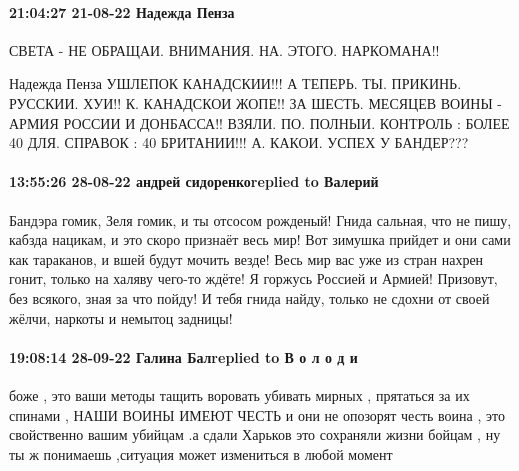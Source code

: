 \paragraph{21:04:27 21-08-22 Надежда Пенза}

СВЕТА - НЕ ОБРАЩАИ. ВНИМАНИЯ. НА. ЭТОГО. НАРКОМАНА!!

Надежда Пенза
УШЛЕПОК КАНАДСКИИ!!!
А ТЕПЕРЬ. ТЫ. ПРИКИНЬ. РУССКИИ. ХУИ!!
К. КАНАДСКОИ ЖОПЕ!!
ЗА ШЕСТЬ. МЕСЯЦЕВ ВОИНЫ -
АРМИЯ РОССИИ И ДОНБАССА!!
ВЗЯЛИ. ПО. ПОЛНЫИ. КОНТРОЛЬ :
БОЛЕЕ 40 %
ДЛЯ. СПРАВОК :
40 %
БРИТАНИИ!!!
А. КАКОИ. УСПЕХ У БАНДЕР???

\paragraph{13:55:26 28-08-22 андрей сидоренкоreplied to Валерий}

Бандэра гомик, Зеля гомик, и ты отсосом рожденый! Гнида сальная, что не пишу,
кабзда нацикам, и это скоро признаёт весь мир! Вот зимушка прийдет и они сами
как тараканов, и вшей будут мочить везде! Весь мир вас уже из стран нахрен
гонит, только на халяву чего-то ждёте! Я горжусь Россией и Армией! Призовут,
без всякого, зная за что пойду! И тебя гнида найду, только не сдохни от своей
жёлчи, наркоты и немытоц задницы!


\paragraph{19:08:14 28-09-22 Галина Балreplied to В о л о д и}

боже , это ваши методы тащить воровать убивать мирных , прятаться за их спинами
, НАШИ ВОИНЫ ИМЕЮТ ЧЕСТЬ и они не опозорят честь воина , это свойственно вашим
убийцам .а сдали Харьков это сохраняли жизни бойцам , ну ты ж понимаешь
,ситуация может измениться в любой момент

